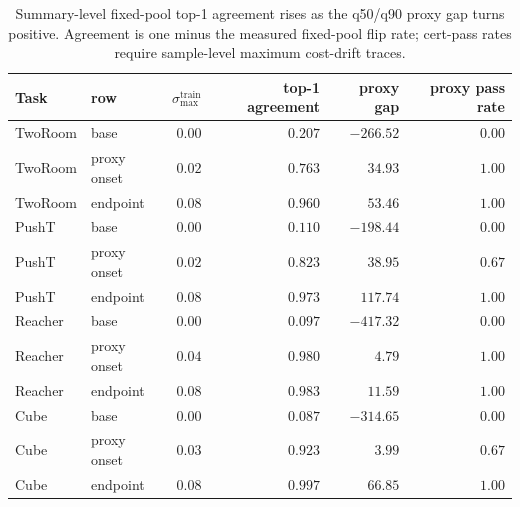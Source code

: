 \begin{table}[H]
\centering
\caption{Summary-level fixed-pool top-1 agreement rises as the q50/q90 proxy gap turns positive. Agreement is one minus the measured fixed-pool flip rate; cert-pass rates require sample-level maximum cost-drift traces.}
\label{tab:fixed-pool-tail-audit}
\small
\setlength{\tabcolsep}{4pt}
\begin{tabular}{llrrrr}
\toprule
Task & row & $\sigma_{\max}^{\mathrm{train}}$ & top-1 agreement & proxy gap & proxy pass rate \\
\midrule
TwoRoom & base & $0.00$ & $0.207$ & $-266.52$ & $0.00$ \\
TwoRoom & proxy onset & $0.02$ & $0.763$ & $34.93$ & $1.00$ \\
TwoRoom & endpoint & $0.08$ & $0.960$ & $53.46$ & $1.00$ \\
PushT & base & $0.00$ & $0.110$ & $-198.44$ & $0.00$ \\
PushT & proxy onset & $0.02$ & $0.823$ & $38.95$ & $0.67$ \\
PushT & endpoint & $0.08$ & $0.973$ & $117.74$ & $1.00$ \\
Reacher & base & $0.00$ & $0.097$ & $-417.32$ & $0.00$ \\
Reacher & proxy onset & $0.04$ & $0.980$ & $4.79$ & $1.00$ \\
Reacher & endpoint & $0.08$ & $0.983$ & $11.59$ & $1.00$ \\
Cube & base & $0.00$ & $0.087$ & $-314.65$ & $0.00$ \\
Cube & proxy onset & $0.03$ & $0.923$ & $3.99$ & $0.67$ \\
Cube & endpoint & $0.08$ & $0.997$ & $66.85$ & $1.00$ \\
\bottomrule
\end{tabular}
\end{table}
